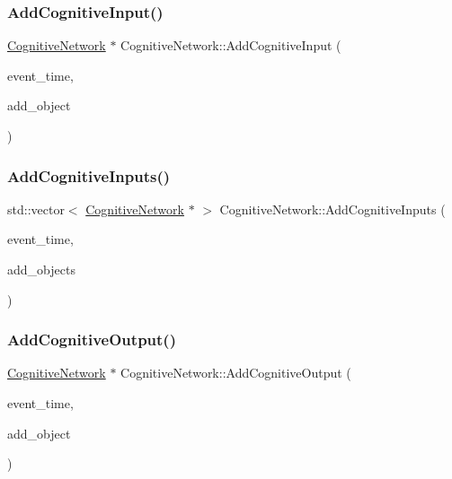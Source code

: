 \subsubsection{\texorpdfstring{Add\+Cognitive\+Input()}{AddCognitiveInput()}}
{\footnotesize\ttfamily \mbox{\hyperlink{classCognitiveNetwork}{Cognitive\+Network}} $\ast$ Cognitive\+Network\+::\+Add\+Cognitive\+Input (\begin{DoxyParamCaption}\item[{std\+::chrono\+::time\+\_\+point$<$ \mbox{\hyperlink{universe_8h_a0ef8d951d1ca5ab3cfaf7ab4c7a6fd80}{Clock}} $>$}]{event\+\_\+time,  }\item[{\mbox{\hyperlink{classCognitiveNetwork}{Cognitive\+Network}} $\ast$}]{add\+\_\+object }\end{DoxyParamCaption})}

\mbox{\label{classCognitiveNetwork_afc92c9b378e7e0873d0164bc4f2635df}} 
\subsubsection{\texorpdfstring{Add\+Cognitive\+Inputs()}{AddCognitiveInputs()}}
{\footnotesize\ttfamily std\+::vector$<$ \mbox{\hyperlink{classCognitiveNetwork}{Cognitive\+Network}} $\ast$ $>$ Cognitive\+Network\+::\+Add\+Cognitive\+Inputs (\begin{DoxyParamCaption}\item[{std\+::chrono\+::time\+\_\+point$<$ \mbox{\hyperlink{universe_8h_a0ef8d951d1ca5ab3cfaf7ab4c7a6fd80}{Clock}} $>$}]{event\+\_\+time,  }\item[{std\+::vector$<$ \mbox{\hyperlink{classCognitiveNetwork}{Cognitive\+Network}} $\ast$$>$}]{add\+\_\+objects }\end{DoxyParamCaption})}

\mbox{\label{classCognitiveNetwork_a8a9b533b89b7d62b21cf41bdf957ef14}} 
\subsubsection{\texorpdfstring{Add\+Cognitive\+Output()}{AddCognitiveOutput()}}
{\footnotesize\ttfamily \mbox{\hyperlink{classCognitiveNetwork}{Cognitive\+Network}} $\ast$ Cognitive\+Network\+::\+Add\+Cognitive\+Output (\begin{DoxyParamCaption}\item[{std\+::chrono\+::time\+\_\+point$<$ \mbox{\hyperlink{universe_8h_a0ef8d951d1ca5ab3cfaf7ab4c7a6fd80}{Clock}} $>$}]{event\+\_\+time,  }\item[{\mbox{\hyperlink{classCognitiveNetwork}{Cognitive\+Network}} $\ast$}]{add\+\_\+object }\end{DoxyParamCaption})}

